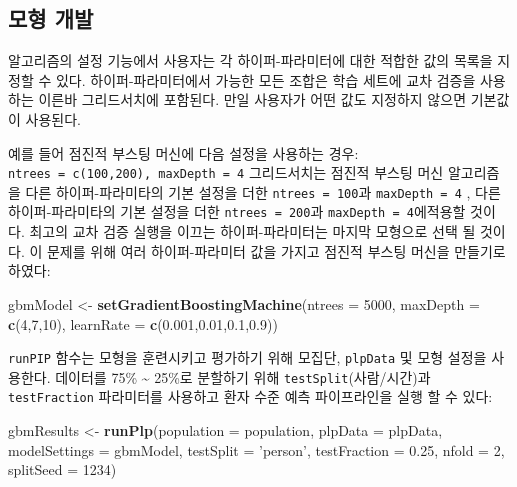 \documentclass[11pt]{book}
\newenvironment{Shaded}{\begin{snugshade}}{\end{snugshade}}
\newcommand{\KeywordTok}[1]{\textcolor[rgb]{0.13,0.29,0.53}{\textbf{#1}}}
\newcommand{\DataTypeTok}[1]{\textcolor[rgb]{0.13,0.29,0.53}{#1}}
\newcommand{\DecValTok}[1]{\textcolor[rgb]{0.00,0.00,0.81}{#1}}
\newcommand{\FloatTok}[1]{\textcolor[rgb]{0.00,0.00,0.81}{#1}}
\newcommand{\StringTok}[1]{\textcolor[rgb]{0.31,0.60,0.02}{#1}}
\newcommand{\NormalTok}[1]{#1}
\theoremstyle{definition}
\theoremstyle{definition}
\theoremstyle{definition}
\theoremstyle{remark}
\begin{document}
\subsection{모형 개발}\label{-}

알고리즘의 설정 기능에서 사용자는 각 하이퍼-파라미터에 대한 적합한 값의
목록을 지정할 수 있다. 하이퍼-파라미터에서 가능한 모든 조합은 학습
세트에 교차 검증을 사용하는 이른바 그리드서치에 포함된다. 만일 사용자가
어떤 값도 지정하지 않으면 기본값이 사용된다.

예를 들어 점진적 부스팅 머신에 다음 설정을 사용하는 경우:
\texttt{ntrees\ =\ c(100,200),\ maxDepth\ =\ 4} 그리드서치는 점진적
부스팅 머신 알고리즘을 다른 하이퍼-파라미타의 기본 설정을 더한
\texttt{ntrees\ =\ 100}과 \texttt{maxDepth\ =\ 4} , 다른
하이퍼-파라미타의 기본 설정을 더한 \texttt{ntrees\ =\ 200}과
\texttt{maxDepth\ =\ 4}에적용할 것이다. 최고의 교차 검증 실행을 이끄는
하이퍼-파라미터는 마지막 모형으로 선택 될 것이다. 이 문제를 위해 여러
하이퍼-파라미터 값을 가지고 점진적 부스팅 머신을 만들기로 하였다:

\begin{Shaded}
\begin{Highlighting}[]
\NormalTok{gbmModel <-}\StringTok{ }\KeywordTok{setGradientBoostingMachine}\NormalTok{(}\DataTypeTok{ntrees =} \DecValTok{5000}\NormalTok{, }
                                       \DataTypeTok{maxDepth =} \KeywordTok{c}\NormalTok{(}\DecValTok{4}\NormalTok{,}\DecValTok{7}\NormalTok{,}\DecValTok{10}\NormalTok{), }
                                       \DataTypeTok{learnRate =} \KeywordTok{c}\NormalTok{(}\FloatTok{0.001}\NormalTok{,}\FloatTok{0.01}\NormalTok{,}\FloatTok{0.1}\NormalTok{,}\FloatTok{0.9}\NormalTok{))}
\end{Highlighting}
\end{Shaded}

\texttt{runPIP} 함수는 모형을 훈련시키고 평가하기 위해 모집단,
\texttt{plpData} 및 모형 설정을 사용한다. 데이터를 75\%
\textasciitilde{} 25\%로 분할하기 위해 \texttt{testSplit}(사람/시간)과
\texttt{testFraction} 파라미터를 사용하고 환자 수준 예측 파이프라인을
실행 할 수 있다:

\begin{Shaded}
\begin{Highlighting}[]
\NormalTok{gbmResults <-}\StringTok{ }\KeywordTok{runPlp}\NormalTok{(}\DataTypeTok{population =}\NormalTok{ population, }
                     \DataTypeTok{plpData =}\NormalTok{ plpData, }
                     \DataTypeTok{modelSettings =}\NormalTok{ gbmModel, }
                     \DataTypeTok{testSplit =} \StringTok{'person'}\NormalTok{,}
                     \DataTypeTok{testFraction =} \FloatTok{0.25}\NormalTok{, }
                     \DataTypeTok{nfold =} \DecValTok{2}\NormalTok{, }
                     \DataTypeTok{splitSeed =} \DecValTok{1234}\NormalTok{)}
\end{Highlighting}
\end{Shaded}
\end{document}
